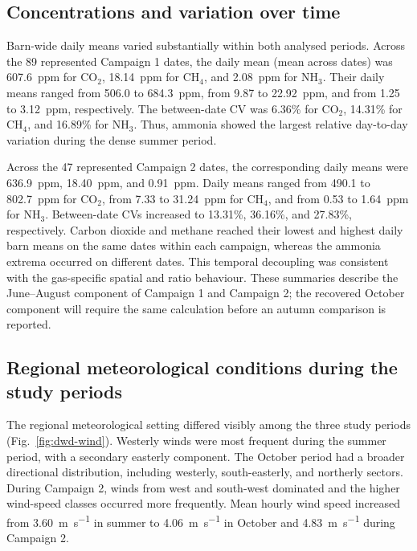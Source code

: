 \documentclass[12pt,a4paper]{article}
\begin{document}
\FloatBarrier
\subsection{Concentrations and variation over time}

Barn-wide daily means varied substantially within both analysed periods. Across
the 89 represented Campaign 1 dates, the daily mean (mean across dates) was
\SI{607.6}{ppm} for \(\mathrm{CO_2}\), \SI{18.14}{ppm} for
\(\mathrm{CH_4}\), and \SI{2.08}{ppm} for \(\mathrm{NH_3}\). Their daily
means ranged from 506.0 to \SI{684.3}{ppm}, from 9.87 to
\SI{22.92}{ppm}, and from 1.25 to \SI{3.12}{ppm}, respectively. The
between-date CV was 6.36\% for \(\mathrm{CO_2}\), 14.31\% for
\(\mathrm{CH_4}\), and 16.89\% for \(\mathrm{NH_3}\). Thus, ammonia
showed the largest relative day-to-day variation during the dense summer
period.

Across the 47 represented Campaign 2 dates, the corresponding daily means were
\SI{636.9}{ppm}, \SI{18.40}{ppm}, and \SI{0.91}{ppm}. Daily means ranged
from 490.1 to \SI{802.7}{ppm} for \(\mathrm{CO_2}\), from 7.33 to
\SI{31.24}{ppm} for \(\mathrm{CH_4}\), and from 0.53 to
\SI{1.64}{ppm} for \(\mathrm{NH_3}\). Between-date CVs increased to
13.31\%, 36.16\%, and 27.83\%, respectively. Carbon dioxide and methane
reached their lowest and highest daily barn means on the same dates within
each campaign, whereas the ammonia extrema occurred on different dates. This
temporal decoupling was consistent with the gas-specific spatial and ratio
behaviour. These summaries describe the June--August component of Campaign 1
and Campaign 2; the recovered October component will require the same
calculation before an autumn comparison is reported.

\subsection{Regional meteorological conditions during the study periods}

The regional meteorological setting differed visibly among the three study
periods (Fig.~\ref{fig:dwd-wind}). Westerly winds were most frequent during the
summer period, with a secondary easterly component. The October period had a
broader directional distribution, including westerly, south-easterly, and
northerly sectors. During Campaign 2, winds from west and south-west dominated
and the higher wind-speed classes occurred more frequently. Mean hourly wind
speed increased from \SI{3.60}{m.s^{-1}} in summer to
\SI{4.06}{m.s^{-1}} in October and \SI{4.83}{m.s^{-1}} during Campaign 2.
\end{document}
